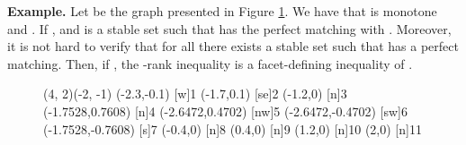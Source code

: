 \noindent \textbf{Example.}
Let  be the graph presented in Figure \ref{minigraph1}. We have that  is monotone and . 
If ,  and  is a stable set such that  has the perfect matching  with . Moreover, it is not hard to verify that for all  there exists a stable set  such that  has a perfect matching.
Then, if , the -rank inequality is a facet-defining inequality of .  
\begin{figure}[h]
  \centering
\begin{graph}(4, 2)(-2, -1)
	(-2.3,-0.1)
	{1}
	(-1.7,0.1)
	[se]{2}
	(-1.2,0)
	{3}
	(-1.7528,0.7608)
	{4}
	(-2.6472,0.4702)
	[nw]{5}
	(-2.6472,-0.4702)
	[sw]{6}
	(-1.7528,-0.7608)
	{7}
	(-0.4,0)
	{8}
	(0.4,0)
	{9}
	(1.2,0)
	{10}
	(2,0)
	{11}
\end{graph}
  \caption{}
  \label{minigraph1}
\end{figure}

